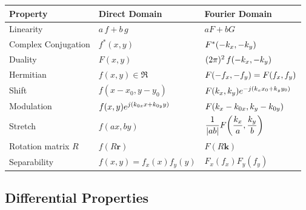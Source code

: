 \begin{center}
\begin{tabular}{lll}
\toprule
Property & Direct Domain & Fourier Domain\\
\midrule

Linearity &
$a\,f+b\,g$
&
$aF+bG$

\\[0.4cm]

Complex Conjugation &
$f^{*}(x,y)$
&
$F^{*}(-k_x,-k_y)$

\\[0.4cm]

Duality &
$F(x,y)$
&
$(2\pi)^2\,f(-k_x,-k_y)$
\\[0.4cm]

Hermitian &
$f(x,y) \in \Re$
&
$F(-f_x,-f_y) = F(f_x,f_y)$
\\[0.4cm]

Shift &
$f(x-x_0,y-y_0)$
&
$F(k_x,k_y)
e^{-j(k_x x_0+k_y y_0)}$
\\[0.4cm]

Modulation &
$f(x,y)
e^{j(k_{0x}x+k_{0y}y)}$
&
$F(k_x-k_{0x},k_y-k_{0y})$
\\[0.4cm]

Stretch &
$f(ax,by)$
&
$\displaystyle
\frac{1}{|ab|}
F\!\left(\frac{k_x}{a},
\frac{k_y}{b}\right)$
\\[0.4cm]

Rotation matrix \(R\) &
$f(R\mathbf{r})$
&
$F(R\mathbf{k})$
\\[0.4cm]

Separability &
$f(x,y) = f_x(x)f_y(y)$ &
$F_x(f_x) F_y(f_y)$
\\

\bottomrule
\end{tabular}
\end{center}

\subsection{Differential Properties}

